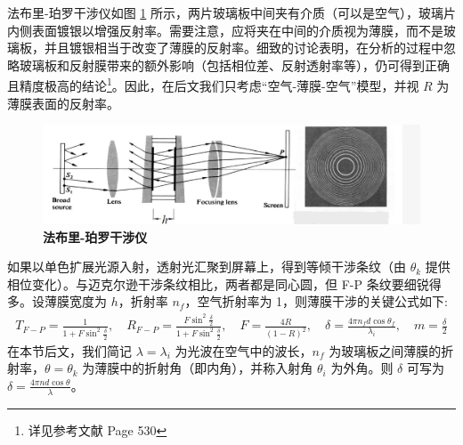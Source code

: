 \documentclass[UTF8]{report}
\theoremstyle{MyLineTheoremStyle} %
\theoremstyle{MyBlockTheoremStyle} %
\theoremstyle{MySubsubsectionStyle} %
\begin{document}
法布里-珀罗干涉仪如图 \ref{法布里-珀罗干涉仪} 所示，两片玻璃板中间夹有介质（可以是空气），玻璃片内侧表面镀银以增强反射率。需要注意，应将夹在中间的介质视为薄膜，而不是玻璃板，并且镀银相当于改变了薄膜的反射率。细致的讨论表明，在分析的过程中忽略玻璃板和反射膜带来的额外影响（包括相位差、反射透射率等），仍可得到正确且精度极高的结论\footnote{详见参考文献 \cite{Optics} Page 530}。因此，在后文我们只考虑“空气-薄膜-空气”模型，并视 $R$ 为薄膜表面的反射率。
\begin{figure}[H]\centering
\includegraphics[width=0.9\columnwidth]{assets/3/法布里-珀罗干涉仪.jpg}
\caption{\bfseries 法布里-珀罗干涉仪}\label{法布里-珀罗干涉仪}
\end{figure}
如果以单色扩展光源入射，透射光汇聚到屏幕上，得到等倾干涉条纹（由 $\theta_k$ 提供相位变化）。与迈克尔逊干涉条纹相比，两者都是同心圆，但 F-P 条纹要细锐得多。设薄膜宽度为 $h$，折射率 $n_f$，空气折射率为 1，则薄膜干涉的关键公式如下: 
\begin{gather}
    T_{F-P} = \frac{1}{1 + F \sin^2 \frac{\delta}{2}},\quad R_{F-P} = \frac{F \sin^2 \frac{\delta}{2}}{1 + F \sin^2 \frac{\delta}{2}},  \quad F = \frac{4R}{(1 - R)^2},\quad \delta = \frac{4 \pi n_f d \cos \theta_f}{\lambda_i},\quad m = \frac{\delta}{2}
\end{gather}
在本节后文，我们简记 $\lambda = \lambda_i$ 为光波在空气中的波长，$n_f$ 为玻璃板之间薄膜的折射率，$\theta = \theta_k$ 为薄膜中的折射角（即内角），并称入射角 $\theta_i$ 为外角。则 $\delta$ 可写为 $\delta = \frac{4 \pi n d \cos \theta}{\lambda}$。
\vspace*{-5mm}
\end{document}
